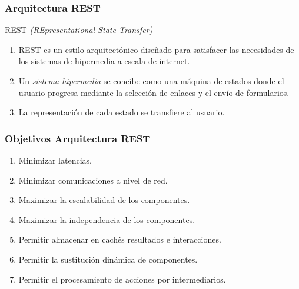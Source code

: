 \documentclass[a4paper,slidestop,xcolor=pst,blue]{beamer}
\begin{document}
\begin{frame}[c]
	\frametitle{Arquitectura REST}
    \begin{block}{REST \emph{(REpresentational State Transfer)}}
        \begin{enumerate}[<+->]
            \item  REST es un estilo arquitectónico diseñado para satisfacer las necesidades de los sistemas de hipermedia a escala de internet.
            \item Un \emph{sistema hipermedia} se concibe como una máquina de estados donde el usuario progresa mediante la selección de enlaces y el envío de formularios.
            \item La representación de cada estado se transfiere al usuario.
        \end{enumerate}
    \end{block}
\end{frame}

\begin{frame}[c]
	\frametitle{Objetivos Arquitectura REST}
    \begin{enumerate}[<+->]
        \item Minimizar latencias.
        \item Minimizar comunicaciones a nivel de red.
        \item Maximizar la escalabilidad de los componentes.
        \item Maximizar la independencia de los componentes.
        \item Permitir almacenar en cachés resultados e interacciones.
        \item Permitir la sustitución dinámica de componentes.
        \item Permitir el procesamiento de acciones por intermediarios.
    \end{enumerate}
\end{frame}
\end{document}
